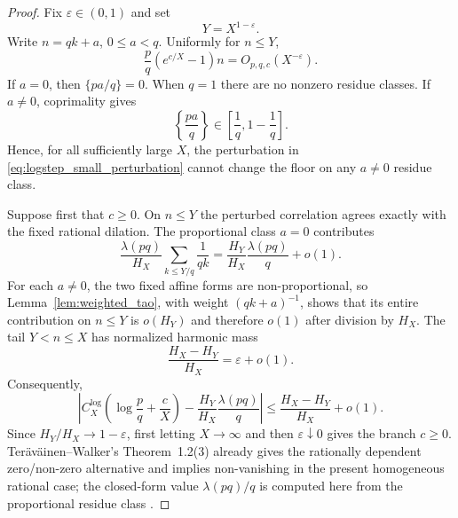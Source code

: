 \documentclass[preprint,12pt]{elsarticle}
\numberwithin{equation}{section}
\theoremstyle{plain}
\theoremstyle{definition}
\theoremstyle{remark}
\begin{document}
\begin{proof}
Fix $\varepsilon\in(0,1)$ and set
\begin{equation}
Y=X^{1-\varepsilon}.
\label{eq:logstep_Y}
\end{equation}
Write $n=qk+a$, $0\le a<q$. Uniformly for $n\le Y$,
\begin{equation}
\frac pq(e^{c/X}-1)n=O_{p,q,c}(X^{-\varepsilon}).
\label{eq:logstep_small_perturbation}
\end{equation}
If $a=0$, then $\{pa/q\}=0$. When $q=1$ there are no nonzero residue classes. If $a\ne0$, coprimality gives
\begin{equation}
\left\{\frac{pa}{q}\right\}\in
\left[\frac1q,1-\frac1q\right].
\label{eq:logstep_fractional_separation}
\end{equation}
Hence, for all sufficiently large $X$, the perturbation in
\eqref{eq:logstep_small_perturbation} cannot change the floor on any
$a\ne0$ residue class.

Suppose first that $c\ge0$. On $n\le Y$ the perturbed correlation agrees
exactly with the fixed rational dilation. The proportional class $a=0$
contributes
\begin{equation}
\frac{\lambda(pq)}{H_X}
\sum_{k\le Y/q}\frac1{qk}
=
\frac{H_Y}{H_X}\frac{\lambda(pq)}q+o(1).
\label{eq:logstep_prop_initial}
\end{equation}
For each $a\ne0$, the two fixed affine forms are non-proportional, so
Lemma~\ref{lem:weighted_tao}, with weight $(qk+a)^{-1}$, shows that its
entire contribution on $n\le Y$ is $o(H_Y)$ and therefore $o(1)$ after
division by $H_X$. The tail $Y<n\le X$ has normalized harmonic mass
\begin{equation}
\frac{H_X-H_Y}{H_X}=\varepsilon+o(1).
\label{eq:logstep_tail_mass}
\end{equation}
Consequently,
\begin{equation}
\left|
C_X^{\log}\!\left(\log\frac pq+\frac cX\right)
-\frac{H_Y}{H_X}\frac{\lambda(pq)}q
\right|
\le
\frac{H_X-H_Y}{H_X}+o(1).
\label{eq:logstep_bilateral}
\end{equation}
Since $H_Y/H_X\to1-\varepsilon$, first letting $X\to\infty$ and then
$\varepsilon\downarrow0$ gives the branch $c\ge0$.
Ter\"av\"ainen--Walker's Theorem~1.2(3) already gives the rationally
dependent zero/non-zero alternative and implies non-vanishing in the present
homogeneous rational case; the closed-form value $\lambda(pq)/q$ is computed
here from the proportional residue class
\cite[Theorem~1.2(3)]{TeravainenWalker2025}.


\end{proof}
\end{document}
